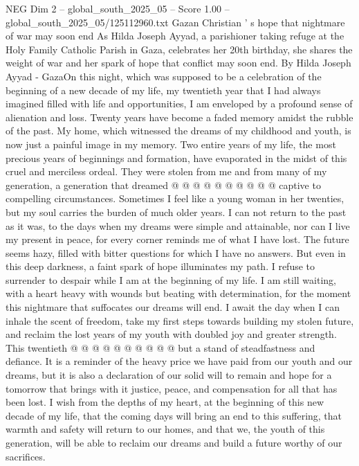\begin{textsample}{NEG Dim 2 – global\_south\_2025\_05 – Score 1.00 – global\_south\_2025\_05/125112960.txt}  \label{ex:f2_neg_405}
Gazan Christian ' s hope that nightmare of war may soon end As Hilda Joseph Ayyad, a parishioner taking refuge at the Holy Family Catholic Parish in Gaza, celebrates her 20th birthday, she shares the weight of war and her spark of hope that conflict may soon end.
By Hilda Joseph Ayyad - GazaOn this night, which was supposed to be a celebration of the beginning of a new decade of my life, my twentieth year that I had always imagined filled with life and opportunities, I am enveloped by a profound sense of alienation and loss.
Twenty years have become a faded memory amidst the rubble of the past.
My home, which witnessed the dreams of my childhood and youth, is now just a painful image in my memory.
Two entire years of my life, the most precious years of beginnings and formation, have evaporated in the midst of this cruel and merciless ordeal.
They were stolen from me and from many of my generation, a generation that dreamed @ @ @ @ @ @ @ @ @ @ captive to compelling circumstances.
Sometimes I feel like a young woman in her twenties, but my soul carries the burden of much older years.
I can not return to the past as it was, to the days when my dreams were simple and attainable, nor can I live my present in peace, for every corner reminds me of what I have lost.
The future seems hazy, filled with bitter questions for which I have no answers.
But even in this deep darkness, a faint spark of hope illuminates my path.
I refuse to surrender to despair while I am at the beginning of my life.
I am still waiting, with a heart heavy with wounds but beating with determination, for the moment this nightmare that suffocates our dreams will end.
I await the day when I can inhale the scent of freedom, take my first steps towards building my stolen future, and reclaim the lost years of my youth with doubled joy and greater strength.
This twentieth @ @ @ @ @ @ @ @ @ @ but a stand of steadfastness and defiance.
It is a reminder of the heavy price we have paid from our youth and our dreams, but it is also a declaration of our solid will to remain and hope for a tomorrow that brings with it justice, peace, and compensation for all that has been lost.
I wish from the depths of my heart, at the beginning of this new decade of my life, that the coming days will bring an end to this suffering, that warmth and safety will return to our homes, and that we, the youth of this generation, will be able to reclaim our dreams and build a future worthy of our sacrifices.

\end{textsample}
